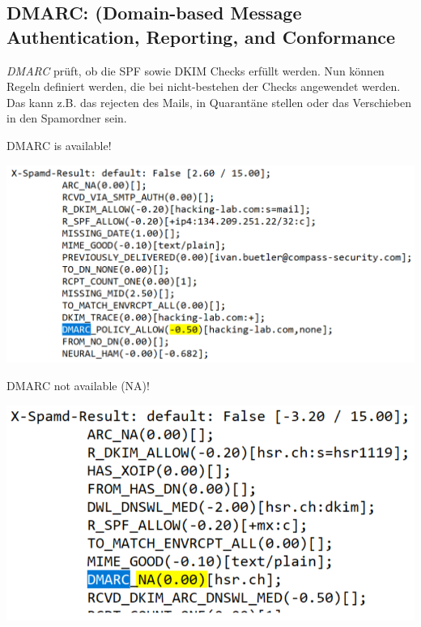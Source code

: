 \subsection{DMARC: (Domain-based Message Authentication, Reporting, and Conformance}
\textit{DMARC} prüft, ob die SPF sowie DKIM Checks erfüllt werden. Nun können Regeln definiert werden, die bei nicht-bestehen der Checks angewendet werden. Das kann z.B. das rejecten des Mails, in Quarantäne stellen oder das Verschieben in den Spamordner sein.

DMARC is available!
\begin{center}
    \vspace{-8pt}
    \includegraphics[width=.8\linewidth]{./img/07-mail_security/dmarc}
    \vspace{-8pt}
\end{center}
DMARC not available (NA)!
\begin{center}
    \vspace{-8pt}
    \includegraphics[width=.6\linewidth]{./img/07-mail_security/dmarc2}
    \vspace{-8pt}
\end{center}


%
%

%
%
%

